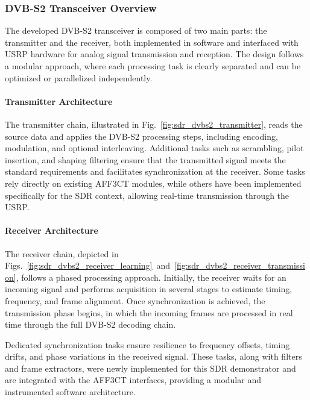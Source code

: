 \documentclass[11pt]{report}
\newcommand{\AFFECT}{AFF3CT\xspace}
\begin{document}
\subsubsection{DVB-S2 Transceiver Overview}

The developed DVB-S2 transceiver is composed of two main parts: the transmitter
and the receiver, both implemented in software and interfaced with USRP
hardware for analog signal transmission and reception. The design follows a
modular approach, where each processing task is clearly separated and can be
optimized or parallelized independently.

\paragraph{Transmitter Architecture}

The transmitter chain, illustrated in Fig.~\ref{fig:sdr_dvbs2_transmitter},
reads the source data and applies the DVB-S2 processing steps, including
encoding, modulation, and optional interleaving. Additional tasks such as
scrambling, pilot insertion, and shaping filtering ensure that the transmitted
signal meets the standard requirements and facilitates synchronization at the
receiver. Some tasks rely directly on existing \AFFECT modules, while others
have been implemented specifically for the SDR context, allowing real-time
transmission through the USRP.

\paragraph{Receiver Architecture}

The receiver chain, depicted in
Figs.~\ref{fig:sdr_dvbs2_receiver_learning}~and~\ref{fig:sdr_dvbs2_receiver_transmission},
follows a phased processing approach. Initially, the receiver waits for an
incoming signal and performs acquisition in several stages to estimate timing,
frequency, and frame alignment. Once synchronization is achieved, the
transmission phase begins, in which the incoming frames are processed in real
time through the full DVB-S2 decoding chain.

Dedicated synchronization tasks ensure resilience to frequency offsets, timing
drifts, and phase variations in the received signal. These tasks, along with
filters and frame extractors, were newly implemented for this SDR demonstrator
and are integrated with the \AFFECT interfaces, providing a modular and
instrumented software architecture.
\end{document}
